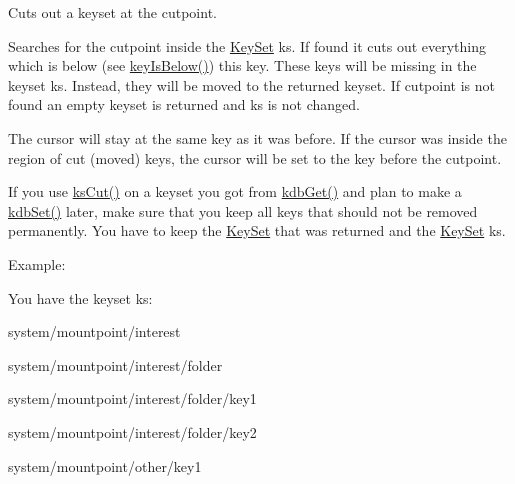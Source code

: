 Cuts out a keyset at the cutpoint. 

Searches for the cutpoint inside the \mbox{\hyperlink{classkdb_1_1KeySet}{Key\+Set}} ks. If found it cuts out everything which is below (see \mbox{\hyperlink{group__keytest_ga03332b5d97c76a4fd2640aca4762b8df}{key\+Is\+Below()}}) this key. These keys will be missing in the keyset {\ttfamily ks}. Instead, they will be moved to the returned keyset. If {\ttfamily cutpoint} is not found an empty keyset is returned and {\ttfamily ks} is not changed.

The cursor will stay at the same key as it was before. If the cursor was inside the region of cut (moved) keys, the cursor will be set to the key before the cutpoint.

If you use \mbox{\hyperlink{group__keyset_ga6b00cf82b59af4d883a9bad6cf4a4a4a}{ks\+Cut()}} on a keyset you got from \mbox{\hyperlink{group__kdb_ga28e385fd9cb7ccfe0b2f1ed2f62453a1}{kdb\+Get()}} and plan to make a \mbox{\hyperlink{group__kdb_ga11436b058408f83d303ca5e996832bcf}{kdb\+Set()}} later, make sure that you keep all keys that should not be removed permanently. You have to keep the \mbox{\hyperlink{classkdb_1_1KeySet}{Key\+Set}} that was returned and the \mbox{\hyperlink{classkdb_1_1KeySet}{Key\+Set}} {\ttfamily ks}.

\begin{DoxyParagraph}{Example\+:}

\end{DoxyParagraph}
You have the keyset {\ttfamily ks\+:} 
\begin{DoxyItemize}
\item {\ttfamily system/mountpoint/interest} 
\item {\ttfamily system/mountpoint/interest/folder} 
\item {\ttfamily system/mountpoint/interest/folder/key1} 
\item {\ttfamily system/mountpoint/interest/folder/key2} 
\item {\ttfamily system/mountpoint/other/key1} 
\end{DoxyItemize}

